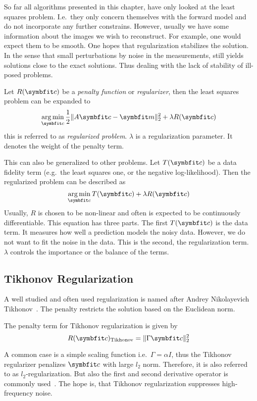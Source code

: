 So far all algorithms presented in this chapter, have only looked at the least squares problem.
I.e.\ they only concern themselves with the forward model and do not incorporate any further
constrains. However, usually we have some information about the images we wish to reconstruct. For
example, one would expect them to be smooth. One hopes that regularization stabilizes the solution.
In the sense that small perturbations by noise in the measurements, still yields solutions close to
the exact solutions. Thus dealing with the lack of stability of ill-posed problems.

\begin{definition}\label{def:regularized_problem}
	Let \(R(\mvec{c})\) be a \textit{penalty function} or \textit{regularizer}, then the least
	squares problem can be expanded to
	\[
		\argmin_{\mvec{c}} \frac{1}{2} \norm{A \mvec{c} - \mvec{m}}_2^2 + \lambda R(\mvec{c})
	\]
	this is referred to as \textit{regularized problem}. \(\lambda\) is a regularization
	parameter. It denotes the weight of the penalty term.
\end{definition}

This can also be generalized to other problems. Let \(T(\mvec{c})\) be a data fidelity term (e.g.\
the least squares one, or the negative log-likelihood). Then the regularized problem can be
described as
\begin{equation}\label{eq:optimization_problem}
	\argmin_{\mvec{c}} T(\mvec{c}) + \lambda R(\mvec{c})
\end{equation}
Usually, \(R\) is chosen to be non-linear and often is expected to be continuously differentiable.
This equation has three parts. The first \(T(\mvec{c})\) is the data term. It measures how well a
prediction models the noisy data. However, we do not want to fit the noise in the data. This is the
second, the regularization term. \(\lambda\) controls the importance or the balance of the terms.

\subsection{Tikhonov Regularization}\label{subsec:tikhonov_regularization}

A well studied and often used regularization is named after Andrey Nikolayevich
Tikhonov~\cite{tihonov_solution_1963}. The penalty restricts the solution based on the Euclidean
norm.

\begin{definition}\label{def:tikhonov_regularization}
	The penalty term for Tikhonov regularization is given by
	\[
		R(\mvec{c})_{\text{Tikhonov}} = \norm{\Gamma \mvec{c}}_2^2
	\]
\end{definition}
A common case is a simple scaling function i.e.\ \(\Gamma = \alpha I\), thus the Tikhonov
regularizer penalizes \(\mvec{c}\) with large \(l_2\) norm. Therefore, it is also referred to as
\(l_2\)-regularization. But also the first and second derivative operator is commonly
used~\cite{golub_tikhonov_1999}. The hope is, that Tikhonov regularization suppresses high-frequency
noise.

